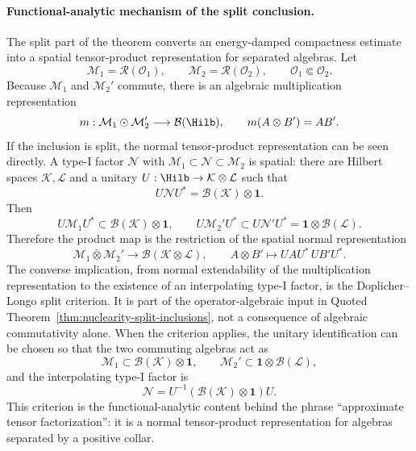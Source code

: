 \paragraph{Functional-analytic mechanism of the split conclusion.}
The split part of the theorem converts an energy-damped compactness estimate
into a spatial tensor-product representation for separated algebras.  Let
\[
  \mathcal M_1=\mathcal R(\mathcal O_1),
  \qquad
  \mathcal M_2=\mathcal R(\mathcal O_2),
  \qquad
  \mathcal O_1\Subset\mathcal O_2 .
\]
Because \(\mathcal M_1\) and \(\mathcal M_2'\) commute, there is an algebraic
multiplication representation
\[
  m:\mathcal M_1\odot\mathcal M_2'\longrightarrow\mathcal B(\Hilb),
  \qquad
  m(A\otimes B')=AB' .
\]
If the inclusion is split, the normal tensor-product representation can be
seen directly.  A type-I factor
\(\mathcal N\) with
\(\mathcal M_1\subset\mathcal N\subset\mathcal M_2\) is spatial: there are
Hilbert spaces \(\mathcal K,\mathcal L\) and a unitary
\(U:\Hilb\to\mathcal K\otimes\mathcal L\) such that
\[
  U\mathcal N U^*=\mathcal B(\mathcal K)\otimes\mathbf 1 .
\]
Then
\[
  U\mathcal M_1U^*\subset\mathcal B(\mathcal K)\otimes\mathbf 1,
  \qquad
  U\mathcal M_2'U^*\subset U\mathcal N'U^*
  =
  \mathbf 1\otimes\mathcal B(\mathcal L).
\]
Therefore the product map is the restriction of the spatial normal
representation
\begin{equation}
  \mathcal M_1\bar\otimes\mathcal M_2'
  \longrightarrow
  \mathcal B(\mathcal K\otimes\mathcal L),
  \qquad
  A\otimes B'\longmapsto
  UAU^*\,UB'U^* .
  \label{eq:split-tensor-product-criterion}
\end{equation}
The converse implication, from normal extendability of the multiplication
representation to the existence of an interpolating type-I factor, is the
Doplicher--Longo split criterion.  It is part of the operator-algebraic input
in Quoted
Theorem~\ref{thm:nuclearity-split-inclusions}, not a consequence
of algebraic commutativity alone.  When the criterion applies, the unitary
identification can be chosen so that the two commuting algebras act as
\[
  \mathcal M_1\subset\mathcal B(\mathcal K)\otimes\mathbf 1,
  \qquad
  \mathcal M_2'\subset\mathbf 1\otimes\mathcal B(\mathcal L),
\]
and the interpolating type-I factor is
\[
  \mathcal N
  =
  U^{-1}\!\left(\mathcal B(\mathcal K)\otimes\mathbf 1\right)U .
\]
This criterion is the functional-analytic content behind the phrase
``approximate tensor factorization'': it is a normal tensor-product
representation for algebras separated by a positive collar.

